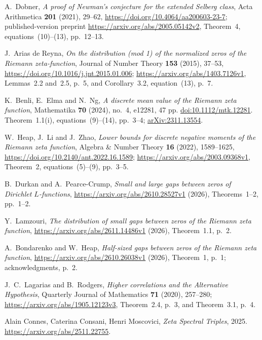  A.~Dobner, \emph{A proof of Newman's conjecture for the extended Selberg class}, Acta Arithmetica \textbf{201} (2021), 29--62, \url{https://doi.org/10.4064/aa200603-23-7}; published-version preprint \url{https://arxiv.org/abs/2005.05142v2}, Theorem~4, equations~(10)--(13), pp.~12--13.

 J.~Arias de Reyna, \emph{On the distribution (mod 1) of the normalized zeros of the Riemann zeta-function}, Journal of Number Theory \textbf{153} (2015), 37--53, \url{https://doi.org/10.1016/j.jnt.2015.01.006}; \url{https://arxiv.org/abs/1403.7126v1}, Lemmas~2.2 and~2.5, p.~5, and Corollary~3.2, equation~(13), p.~7.

 K.~Benli, E.~Elma and N.~Ng,
\emph{A discrete mean value of the Riemann zeta function},
Mathematika \textbf{70} (2024), no.~4, e12281, 47 pp.
\href{https://doi.org/10.1112/mtk.12281}{doi:10.1112/mtk.12281}.
Theorem~1.1(i), equations~(9)--(14), pp.~3--4;
\href{https://arxiv.org/abs/2311.13554}{arXiv:2311.13554}.

 W.~Heap, J.~Li and J.~Zhao, \emph{Lower bounds for discrete negative moments of the Riemann zeta function}, Algebra \& Number Theory \textbf{16} (2022), 1589--1625, \url{https://doi.org/10.2140/ant.2022.16.1589}; \url{https://arxiv.org/abs/2003.09368v1}, Theorem~2, equations~(5)--(9), pp.~3--5.

 B.~Durkan and A.~Pearce-Crump, \emph{Small and large gaps between zeros of Dirichlet $L$-functions}, \url{https://arxiv.org/abs/2610.28527v1} (2026), Theorems~1--2, pp.~1--2.

 Y.~Lamzouri, \emph{The distribution of small gaps between zeros of the Riemann zeta function}, \url{https://arxiv.org/abs/2611.14486v1} (2026), Theorem~1.1, p.~2.


 A.~Bondarenko and W.~Heap, \emph{Half-sized gaps between zeros of the Riemann zeta function}, \url{https://arxiv.org/abs/2610.26038v1} (2026), Theorem~1, p.~1; acknowledgments, p.~2.

 J.~C.~Lagarias and B.~Rodgers, \emph{Higher correlations and the Alternative Hypothesis}, Quarterly Journal of Mathematics \textbf{71} (2020), 257--280; \url{https://arxiv.org/abs/1905.12123v3}, Theorem~2.4, p.~3, and Theorem~3.1, p.~4.

 Alain Connes, Caterina Consani, Henri Moscovici, \emph{Zeta Spectral Triples}, 2025. \url{https://arxiv.org/abs/2511.22755}.


